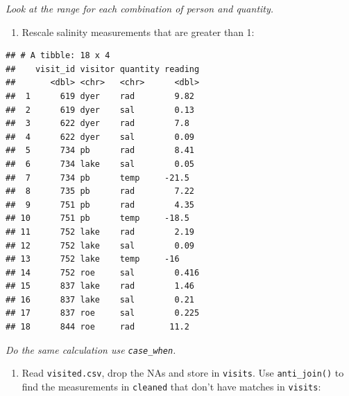 \documentclass[]{Nemilov}
\newenvironment{Shaded}{\begin{snugshade}}{\end{snugshade}}
\newcommand{\DataTypeTok}[1]{\textcolor[rgb]{0.13,0.29,0.53}{#1}}
\newcommand{\DecValTok}[1]{\textcolor[rgb]{0.00,0.00,0.81}{#1}}
\newcommand{\FloatTok}[1]{\textcolor[rgb]{0.00,0.00,0.81}{#1}}
\newcommand{\KeywordTok}[1]{\textcolor[rgb]{0.13,0.29,0.53}{\textbf{#1}}}
\newcommand{\NormalTok}[1]{#1}
\newcommand{\OperatorTok}[1]{\textcolor[rgb]{0.81,0.36,0.00}{\textbf{#1}}}
\newcommand{\StringTok}[1]{\textcolor[rgb]{0.31,0.60,0.02}{#1}}
\providecommand{\tightlist}{%
  \setlength{\itemsep}{0pt}\setlength{\parskip}{0pt}}
\begin{document}
\emph{Look at the range for each combination of person and quantity.}

\begin{enumerate}
\def\labelenumi{\arabic{enumi}.}
\setcounter{enumi}{4}
\tightlist
\item
  Rescale salinity measurements that are greater than 1:
\end{enumerate}

\begin{Shaded}
\end{Shaded}

\begin{verbatim}
## # A tibble: 18 x 4
##    visit_id visitor quantity reading
##       <dbl> <chr>   <chr>      <dbl>
##  1      619 dyer    rad        9.82 
##  2      619 dyer    sal        0.13 
##  3      622 dyer    rad        7.8  
##  4      622 dyer    sal        0.09 
##  5      734 pb      rad        8.41 
##  6      734 lake    sal        0.05 
##  7      734 pb      temp     -21.5  
##  8      735 pb      rad        7.22 
##  9      751 pb      rad        4.35 
## 10      751 pb      temp     -18.5  
## 11      752 lake    rad        2.19 
## 12      752 lake    sal        0.09 
## 13      752 lake    temp     -16    
## 14      752 roe     sal        0.416
## 15      837 lake    rad        1.46 
## 16      837 lake    sal        0.21 
## 17      837 roe     sal        0.225
## 18      844 roe     rad       11.2
\end{verbatim}

\emph{Do the same calculation use \texttt{case\_when}.}

\begin{enumerate}
\def\labelenumi{\arabic{enumi}.}
\setcounter{enumi}{5}
\tightlist
\item
  Read \texttt{visited.csv}, drop the NAs and store in \texttt{visits}. Use \texttt{anti\_join()} to find the measurements in \texttt{cleaned} that don't have matches in \texttt{visits}:
\end{enumerate}
\end{document}
